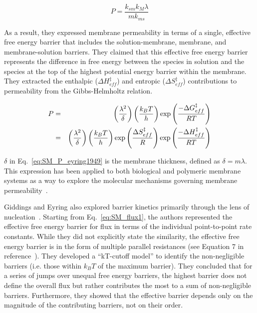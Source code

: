 \begin{equation}
    P = \frac{k_{sm} k_M \lambda}{m k_{ms}}
\end{equation}

\noindent As a result, they expressed membrane permeability in terms of a single, effective free energy barrier that includes the solution-membrane, membrane, and membrane-solution barriers. They claimed that this effective free energy barrier represents the difference in free energy between the species in solution and the species at the top of the highest potential energy barrier within the membrane. They extracted the enthalpic ($\Delta H_{eff}^{\ddagger}$) and entropic ($\Delta S_{eff}^{\ddagger}$) contributions to permeability from the Gibbs-Helmholtz relation. 

\begin{eqnarray}
    P &=& \left( \frac{\lambda^2}{\delta} \right) \left( \frac{k_B T}{h} \right) \exp{\left( \frac{-\Delta G_{eff}^{\ddagger}}{R T} \right)} \nonumber \\ 
    &=& \left( \frac{\lambda^2}{\delta} \right) \left( \frac{k_B T}{h} \right) \exp{\left( \frac{\Delta S_{eff}^{\ddagger}}{R} \right)} \exp{\left( \frac{-\Delta H_{eff}^{\ddagger}}{R T} \right)}
    \label{eq:SM_P_eyring1949}
\end{eqnarray}

$\delta$ in Eq.~\ref{eq:SM_P_eyring1949} is the membrane thickness, defined as $\delta = m\lambda$. This expression has been applied to both biological and polymeric membrane systems as a way to explore the molecular mechanisms governing membrane permeability~\cite{lopez_enthalpic_2017,shefer_enthalpic_2021,shefer_applying_2022}.

Giddings and Eyring also explored barrier kinetics primarily through the lens of nucleation~\cite{giddings_multi-barrier_1958}. Starting from Eq.~\ref{eq:SM_flux1}, the authors represented the effective free energy barrier for flux in terms of the individual point-to-point rate constants. While they did not explicitly state the similarity, the effective free energy barrier is in the form of multiple parallel resistances (see Equation 7 in reference~\cite{giddings_multi-barrier_1958}). They developed a “kT-cutoff model” to identify the non-negligible barriers (i.e. those within $k_B T$ of the maximum barrier). They concluded that for a series of jumps over unequal free energy barriers, the highest barrier does not define the overall flux but rather contributes the most to a sum of non-negligible barriers. Furthermore, they showed that the effective barrier depends only on the magnitude of the contributing barriers, not on their order. 

